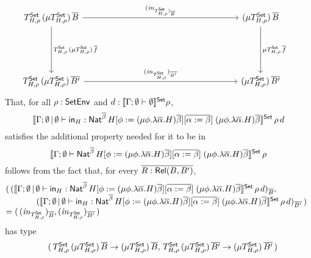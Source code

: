 \documentclass{lmcs}
\theoremstyle{plain}\newtheorem{satz}[thm]{Satz}
\newcommand{\set}{\mathsf{Set}}
\begin{document}
{\begin{itemize}
  {\tiny
  \[\hspace*{-0.15in}\begin{tikzcd}[column sep=2.5in, row sep=0.75in]
T^\set_{H,\rho}\, (\mu
T^\set_{H,\rho})\, \ol{B} \ar[d, "{T^\set_{H,\rho}\, (\mu T^\set_{H,\rho})\, \ol{f}}"]
\ar[r,"{(\mathit{in}_{T^\set_{H,\rho})_{\ol{B}}}}" ] & 
  (\mu T^\set_{H,\rho})\, \ol{B}
\ar[d,"{\mu {T^\set_{H,\rho}}\, {\ol{f}}}" ] 
\\
T^\set_{H,\rho}\, (\mu T^\set_{H,\rho})\,
\ol{B'} \ar[r, "{(\mathit{in}_{T^\set_{H,\rho}})_{\ol{B'}}}"] & (\mu
T^\set_{H,\rho})\, 
\ol{B'}
\end{tikzcd}\]
}
  That, for all $\rho : \mathsf{SetEnv}$ and $d :
\setsem{\Gamma;\emptyset \vdash \emptyset}\rho$,
\[\setsem{\Gamma;\emptyset \,|\, \emptyset \vdash
  \tin_H : \Nat^{\ol{\beta}} \, H[\phi := (\mu \phi.\lambda
    {\overline \alpha}.H){\overline \beta}][\ol{\alpha := \beta}]
  \;(\mu \phi.\lambda {\overline \alpha}.H){\overline
    \beta}}\,\rho\,d\] satisfies the additional property needed for
it to be in 
\[\setsem{\Gamma;\emptyset \vdash
  \Nat^{\ol{\beta}} \, H[\phi := (\mu \phi.\lambda
    {\overline \alpha}.H){\overline \beta}][\ol{\alpha := \beta}]
  \;(\mu \phi.\lambda {\overline \alpha}.H){\overline \beta}}\,\rho\]
follows from the fact that, for every $\overline{R : \mathsf{Rel}(B,B')}$,
\[\hspace*{-0.2in}
  \begin{array}{ll}
 & (\,(\setsem{\Gamma;\emptyset \,|\, \emptyset \vdash \tin_H :
      \Nat^{\ol{\beta}} \, H[\phi := (\mu \phi.\lambda
        {\overline \alpha}.H){\overline \beta}][\ol{\alpha := \beta}]
      \;(\mu \phi.\lambda {\overline \alpha}.H){\overline
        \beta}}\,\rho\,d)_{\ol{B}},\,\\ & \hspace*{0.5in}(\setsem{\Gamma;\emptyset
      \,|\, \emptyset \vdash \tin_H : \Nat^{\ol{\beta}} \,
      H[\phi := (\mu \phi.\lambda {\overline \alpha}.H){\overline
          \beta}][\ol{\alpha := \beta}] \;(\mu \phi.\lambda {\overline
        \alpha}.H){\overline
        \beta}}\,\rho\,d)_{\ol{B'}}\,)\\ &= (\,
    (\mathit{in}_{T^\set_{H,\rho}})_{\ol{B}},
    (\mathit{in}_{T^\set_{H,\rho}})_{\ol{B'}}\,)
\end{array}\]
has type
\[\begin{array}{ll}
& (\, T^\set_{H,\rho}\, (\mu T^\set_{H,\rho}) \, \ol{B} \to (\mu
T^\set_{H,\rho}) \, \ol{B}, \, T^\set_{H,\rho}\, (\mu T^\set_{H,\rho})
\, \ol{B'} \to (\mu T^\set_{H,\rho}) \,\ol{B'} \, )\\[1ex]

\end{array}\]
\end{itemize}}
\end{document}

